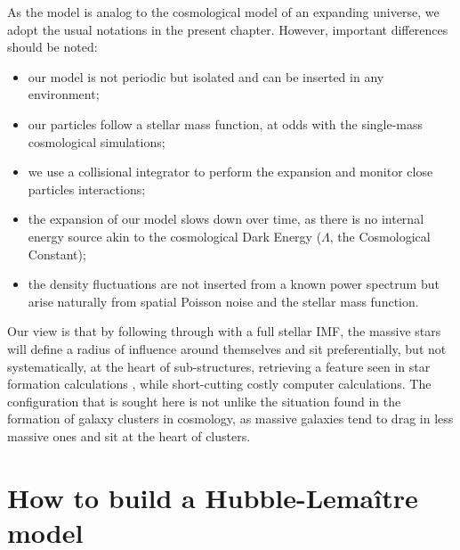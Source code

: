 As the model is analog to the cosmological model of an expanding universe, we adopt the usual notations in the present chapter. However, important differences should be noted:
\begin{itemize}
\item our model is not periodic but isolated and can be inserted in any environment;
\item our particles follow a stellar mass function, at odds with the single-mass cosmological simulations;
\item we use a collisional integrator to perform the expansion and monitor close particles interactions;
\item the expansion of our model slows down over time, as there is no internal energy source akin to the cosmological Dark Energy ($\Lambda$, the Cosmological Constant);
\item the density fluctuations are not inserted from a known power spectrum but arise naturally from spatial Poisson noise and the stellar mass function.
\end{itemize}

Our view is that by following through with a full stellar IMF, the massive stars will define a radius of influence around themselves and sit preferentially, but not systematically, at the heart of sub-structures, retrieving a feature seen in star formation calculations \citep{Moeckel2011,Maschberger2010}, while short-cutting  costly computer calculations. The configuration that is sought here is not unlike the situation found in the formation of galaxy clusters in cosmology, as massive galaxies tend to drag in less massive ones and sit at the heart of clusters.

%



\section{How to build a Hubble-Lema\^itre model}

